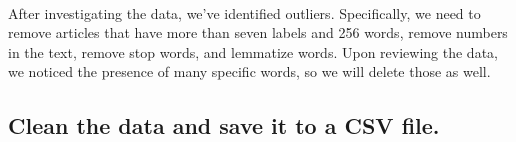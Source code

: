 \documentclass[../main.tex]{subfiles}
\begin{document}
    \begin{center}
    \end{center}
    { \hspace*{\fill} \\}
    
    After investigating the data, we've identified outliers. Specifically,
we need to remove articles that have more than seven labels and 256
words, remove numbers in the text, remove stop words, and lemmatize
words. Upon reviewing the data, we noticed the presence of many specific
words, so we will delete those as well.

    \subsection{Clean the data and save it to a CSV
file.}\label{clean-the-data-and-save-it-to-a-csv-file.}
\end{document}
